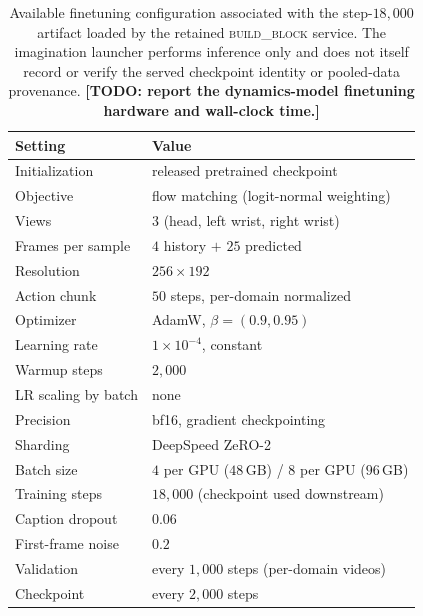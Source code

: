 \documentclass[letterpaper]{article} %
\newcommand{\todo}[1]{\textbf{[TODO: #1]}}
\begin{document}
\begin{table}[t]
\centering\small\setlength{\tabcolsep}{4pt}
\begin{tabular}{@{}ll@{}}
\toprule
Setting & Value \\
\midrule
Initialization      & released pretrained checkpoint \\
Objective           & flow matching (logit-normal weighting) \\
Views               & $3$ (head, left wrist, right wrist) \\
Frames per sample   & $4$ history $+$ $25$ predicted \\
Resolution          & $256{\times}192$ \\
Action chunk        & $50$ steps, per-domain normalized \\
Optimizer           & AdamW, $\beta=(0.9, 0.95)$ \\
Learning rate       & $1{\times}10^{-4}$, constant \\
Warmup steps        & $2{,}000$ \\
LR scaling by batch & none \\
Precision           & bf16, gradient checkpointing \\
Sharding            & DeepSpeed ZeRO-2 \\
Batch size          & $4$ per GPU ($48$\,GB) / $8$ per GPU ($96$\,GB) \\
Training steps      & $18{,}000$ (checkpoint used downstream) \\
Caption dropout     & $0.06$ \\
First-frame noise   & $0.2$ \\
Validation          & every $1{,}000$ steps (per-domain videos) \\
Checkpoint          & every $2{,}000$ steps \\
\bottomrule
\end{tabular}
\caption{Available finetuning configuration associated with the
step-$18{,}000$ artifact loaded by the retained \textsc{build\_block} service.
The imagination launcher performs inference only and does not itself record or
verify the served checkpoint identity or pooled-data provenance.
\todo{report the dynamics-model finetuning hardware and wall-clock time.}}
\label{tab:wmhp}
\end{table}
\end{document}

